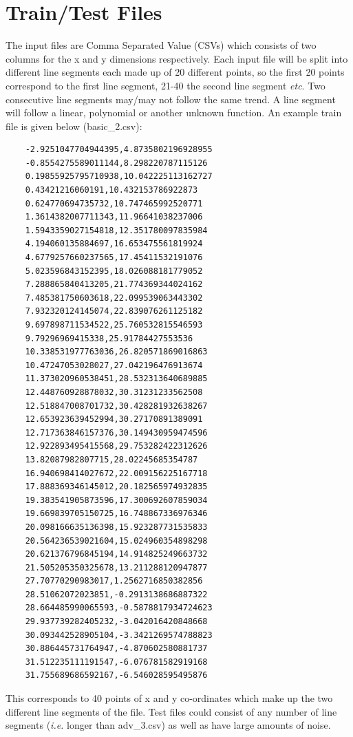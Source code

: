 \documentclass[10pt]{article}
\begin{document}
\section{Train/Test Files}
\label{sec:train_files}
The input files are Comma Separated Value (CSVs) which consists of two columns for the x and y dimensions respectively.
Each input file will be split into different line segments each made up of 20 different points, so the first 20 points correspond to the first line segment, 21-40 the second line segment \textit{etc}.
Two consecutive line segments may/may not follow the same trend.
A line segment will follow a linear, polynomial or another unknown function.
An example train file is given below (basic\_2.csv): 

\begin{verbatim}
    -2.9251047704944395,4.8735802196928955
    -0.8554275589011144,8.298220787115126
    0.19855925795710938,10.042225113162727
    0.43421216060191,10.432153786922873
    0.624770694735732,10.747465992520771
    1.3614382007711343,11.96641038237006
    1.5943359027154818,12.351780097835984
    4.194060135884697,16.653475561819924
    4.6779257660237565,17.45411532191076
    5.023596843152395,18.026088181779052
    7.288865840413205,21.774369344024162
    7.485381750603618,22.099539063443302
    7.932320124145074,22.839076261125182
    9.697898711534522,25.760532815546593
    9.79296969415338,25.91784427553536
    10.338531977763036,26.820571869016863
    10.47247053028027,27.042196476913674
    11.373020960538451,28.532313640689885
    12.448760928878032,30.31231233562508
    12.518847008701732,30.428281932638267
    12.653923639452994,30.27170891389091
    12.717363846157376,30.149430959474596
    12.922893495415568,29.753282422312626
    13.82087982807715,28.02245685354787
    16.940698414027672,22.009156225167718
    17.888369346145012,20.182565974932835
    19.383541905873596,17.300692607859034
    19.669839705150725,16.748867336976346
    20.098166635136398,15.923287731535833
    20.564236539021604,15.024960354898298
    20.621376796845194,14.914825249663732
    21.505205350325678,13.211288120947877
    27.70770290983017,1.2562716850382856
    28.51062072023851,-0.2913138686887322
    28.664485990065593,-0.5878817934724623
    29.937739282405232,-3.042016420848668
    30.093442528905104,-3.3421269574788823
    30.886445731764947,-4.870602580881737
    31.512235111191547,-6.076781582919168
    31.755689686592167,-6.546028595495876
\end{verbatim}

This corresponds to 40 points of x and y co-ordinates which make up the two different line segments of the file. 
Test files could consist of any number of line segments (\textit{i.e.} longer than adv\_3.csv) as well as have large amounts of noise. 
\end{document}
